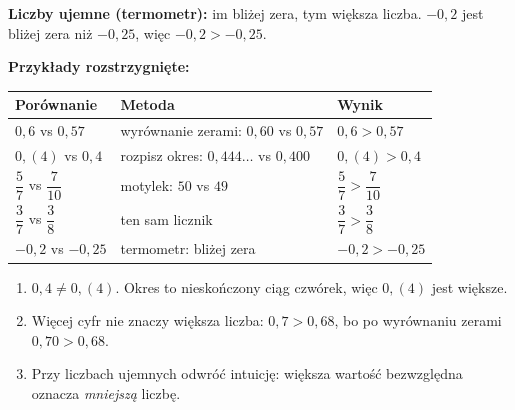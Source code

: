 \documentclass[11pt,a4paper]{article}
\begin{document}
\vspace{0.2em}
\textbf{Liczby ujemne (termometr):} im bliżej zera, tym większa liczba. $-0{,}2$ jest bliżej zera niż $-0{,}25$, więc $-0{,}2>-0{,}25$.

\vspace{0.2em}
\textbf{Przykłady rozstrzygnięte:}
\begin{center}
\renewcommand{\arraystretch}{1.4}
\begin{tabular}{@{}lll@{}}
\toprule
Porównanie & Metoda & Wynik \\
\midrule
$0{,}6$ vs $0{,}57$ & wyrównanie zerami: $0{,}60$ vs $0{,}57$ & $0{,}6>0{,}57$ \\
$0{,}(4)$ vs $0{,}4$ & rozpisz okres: $0{,}444\ldots$ vs $0{,}400$ & $0{,}(4)>0{,}4$ \\
$\dfrac{5}{7}$ vs $\dfrac{7}{10}$ & motylek: $50$ vs $49$ & $\dfrac{5}{7}>\dfrac{7}{10}$ \\
$\dfrac{3}{7}$ vs $\dfrac{3}{8}$ & ten sam licznik & $\dfrac{3}{7}>\dfrac{3}{8}$ \\
$-0{,}2$ vs $-0{,}25$ & termometr: bliżej zera & $-0{,}2>-0{,}25$ \\
\bottomrule
\end{tabular}
\end{center}

\begin{pulapka}
\begin{enumerate}[leftmargin=*, itemsep=2pt]
  \item $0{,}4\neq 0{,}(4)$. Okres to nieskończony ciąg czwórek, więc $0{,}(4)$ jest większe.
  \item Więcej cyfr nie znaczy większa liczba: $0{,}7>0{,}68$, bo po wyrównaniu zerami $0{,}70>0{,}68$.
  \item Przy liczbach ujemnych odwróć intuicję: większa wartość bezwzględna oznacza \emph{mniejszą} liczbę.
\end{enumerate}
\end{pulapka}
\end{document}
